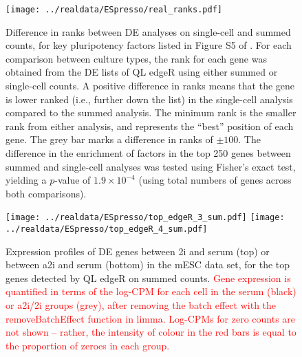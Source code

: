 \documentclass{article}
\newcommand\revised[1]{\textcolor{red}{#1}}
\begin{document}

\begin{figure}[p]
\begin{center}
    \texttt{[image: ../realdata/ESpresso/real\_ranks.pdf]}
\end{center}
\caption{
    Difference in ranks between DE analyses on single-cell and summed counts, for key pluripotency factors listed in Figure S5 of \cite{kolod2015single}.
    For each comparison between culture types, the rank for each gene was obtained from the DE lists of QL edgeR using either summed or single-cell counts.
    A positive difference in ranks means that the gene is lower ranked (i.e., further down the list) in the single-cell analysis compared to the summed analysis.
    The minimum rank is the smaller rank from either analysis, and represents the ``best'' position of each gene.
    The grey bar marks a difference in ranks of $\pm100$.
    The difference in the enrichment of factors in the top 250 genes between summed and single-cell analyses was tested using Fisher's exact test, yielding a $p$-value of $1.9 \times 10^{-4}$ (using total numbers of genes across both comparisons). 
}
\end{figure}

\begin{figure}[p]
    \begin{center}
        \texttt{[image: ../realdata/ESpresso/top\_edgeR\_3\_sum.pdf]}
        \texttt{[image: ../realdata/ESpresso/top\_edgeR\_4\_sum.pdf]}
    \end{center}
\caption{
    Expression profiles of DE genes between 2i and serum (top) or between a2i and serum (bottom) in the mESC data set, for the top genes detected by QL edgeR on summed counts.
    \revised{Gene expression is quantified in terms of the log-CPM for each cell in the serum (black) or a2i/2i groups (grey), after removing the batch effect with the removeBatchEffect function in limma.
    Log-CPMs for zero counts are not shown -- rather, the intensity of colour in the red bars is equal to the proportion of zeroes in each group.}
}
\label{fig:realdata}
\end{figure}

 
\end{document}
